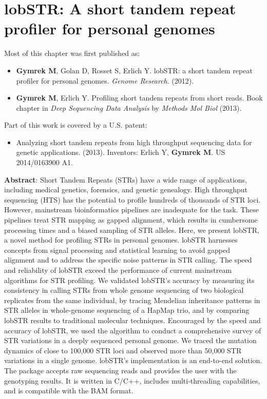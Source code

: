 \chapter{lobSTR: A short tandem repeat profiler for personal genomes}

\hzline

Most of this chapter was first published as:

\begin{itemize}
\item[] \textbf{Gymrek M}, Golan D, Rosset S, Erlich Y. lobSTR: a short tandem repeat profiler for personal genomes. \emph{Genome Research}. (2012).
\item[] \textbf{Gymrek M}, Erlich Y. Profiling short tandem repeats from short reads. Book chapter in \emph{Deep Sequencing Data Analysis} by \emph{Methods Mol Biol} (2013).
\end{itemize}

Part of this work is covered by a U.S. patent:

\begin{itemize}
\item[] Analyzing short tandem repeats from high throughput sequencing data for genetic applications. (2013). Inventors: Erlich Y, \textbf{Gymrek M}. US 2014/0163900 A1.
\end{itemize}

\hzline

\textbf{Abstract}: Short Tandem Repeats (STRs) have a wide range of applications, including medical genetics, forensics, and genetic genealogy. High throughput sequencing (HTS) has the potential to profile hundreds of thousands of STR loci. However, mainstream bioinformatics pipelines are inadequate for the task. These pipelines treat STR mapping as gapped alignment, which results in cumbersome processing times and a biased sampling of STR alleles. Here, we present lobSTR, a novel method for profiling STRs in personal genomes. lobSTR harnesses concepts from signal processing and statistical learning to avoid gapped alignment and to address the specific noise patterns in STR calling. The speed and reliability of lobSTR exceed the performance of current mainstream algorithms for STR profiling. We validated lobSTR's accuracy by measuring its consistency in calling STRs from whole genome sequencing of two biological replicates from the same individual, by tracing Mendelian inheritance patterns in STR alleles in whole-genome sequencing of a HapMap trio, and by comparing lobSTR results to traditional molecular techniques. Encouraged by the speed and accuracy of lobSTR, we used the algorithm to conduct a comprehensive survey of STR variations in a deeply sequenced personal genome. We traced the mutation dynamics of close to 100,000 STR loci and observed more than 50,000 STR variations in a single genome. lobSTR's implementation is an end-to-end solution. The package accepts raw sequencing reads and provides the user with the genotyping results. It is written in C/C++, includes multi-threading capabilities, and is compatible with the BAM format.

